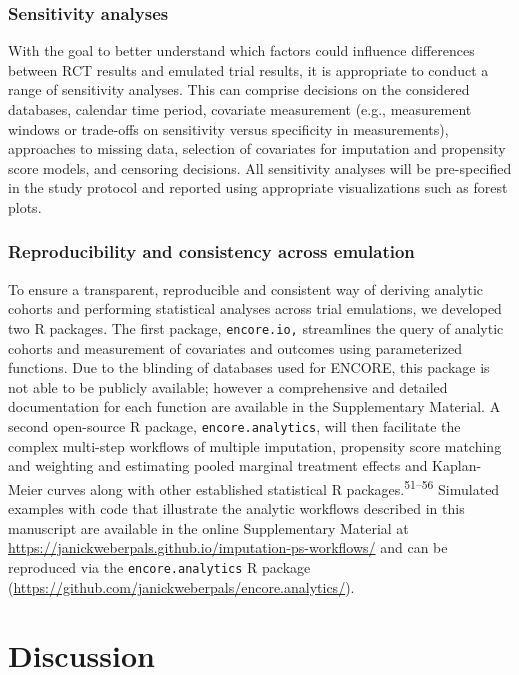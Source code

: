 \documentclass[
  letterpaper,
  DIV=11,
  numbers=noendperiod]{scrartcl}
\begin{document}
\subsubsection{Sensitivity analyses}\label{sensitivity-analyses}

With the goal to better understand which factors could influence
differences between RCT results and emulated trial results, it is
appropriate to conduct a range of sensitivity analyses. This can
comprise decisions on the considered databases, calendar time period,
covariate measurement (e.g., measurement windows or trade-offs on
sensitivity versus specificity in measurements), approaches to missing
data, selection of covariates for imputation and propensity score
models, and censoring decisions. All sensitivity analyses will be
pre-specified in the study protocol and reported using appropriate
visualizations such as forest plots.

\subsubsection{Reproducibility and consistency across
emulation}\label{reproducibility-and-consistency-across-emulation}

To ensure a transparent, reproducible and consistent way of deriving
analytic cohorts and performing statistical analyses across trial
emulations, we developed two R packages. The first package,
\texttt{encore.io,} streamlines the query of analytic cohorts and
measurement of covariates and outcomes using parameterized functions.
Due to the blinding of databases used for ENCORE, this package is not
able to be publicly available; however a comprehensive and detailed
documentation for each function are available in the Supplementary
Material. A second open-source R package, \texttt{encore.analytics},
will then facilitate the complex multi-step workflows of multiple
imputation, propensity score matching and weighting and estimating
pooled marginal treatment effects and Kaplan-Meier curves along with
other established statistical R packages.\textsuperscript{51--56}
Simulated examples with code that illustrate the analytic workflows
described in this manuscript are available in the online Supplementary
Material at
\url{https://janickweberpals.github.io/imputation-ps-workflows/} and can
be reproduced via the \texttt{encore.analytics} R package
(\url{https://github.com/janickweberpals/encore.analytics/}).

\newpage{}

\section{Discussion}\label{discussion}
\end{document}
